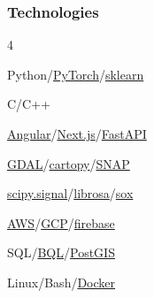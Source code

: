 \documentclass{article}
\newenvironment{mylist}[2]{
  \subsubsection*{#1}
  \begin{multicols}{#2}
  \small
  \begin{list}{}{}
   \setlength{\topsep}{0pt}
   \setlength{\itemsep}{1pt}
   \setlength{\parskip}{0pt}
   \setlength{\parsep}{0pt}}{\end{list}\end{multicols}\normalsize}
\def\bsp{-.1in}
\begin{document}
\begin{mylist}{Technologies}{4}
\item Python/\href{https://pytorch.org/}{PyTorch}/\href{https://scikit-learn.org/stable/}{sklearn}
\item C/C++
\item \href{https://angular.io/}{Angular}/\href{https://nextjs.org/}{Next.js}/\href{https://fastapi.tiangolo.com/}{FastAPI}%
\item \href{https://gdal.org/en/stable/}{GDAL}/\href{https://scitools.org.uk/cartopy/docs/latest/}{cartopy}/\href{https://step.esa.int/main/download/snap-download/}{SNAP}
\item
\href{https://scipy.github.io/devdocs/reference/signal.html#module-scipy.signal}{scipy.signal}/\href{https://librosa.org}{librosa}/\href{https://github.com/chirlu/sox}{sox}%
\item \href{https://aws.amazon.com/}{AWS}/\href{https://cloud.google.com/}{GCP}/\href{https://firebase.google.com/}{firebase}
\item SQL/\href{https://docs.cloud.google.com/bigquery/docs}{BQL}/\href{https://postgis.net/}{PostGIS}
\item Linux/Bash/\href{https://www.docker.com/}{Docker}
\end{mylist}

\newcommand{\BSec}[1]{
\noindent{\hspace{\bsp} \LARGE{\bf #1}{ }\hrulefill}}

\TabPositions{2.4in} %
\def\tabb{\tab}  %
\end{document}
